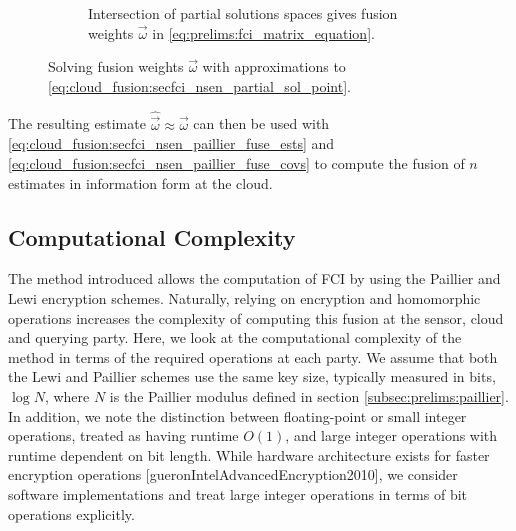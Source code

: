 \begin{figure}[htbp]
\begin{subfigure}[htbp]{\textwidth}
\begin{center}
        \end{center}
        \caption{Intersection of partial solutions spaces gives fusion weights $\vec{\omega}$ in \eqref{eq:prelims:fci_matrix_equation}.}
        \label{fig:3sen_planes}
    \end{subfigure}
    \caption{Solving fusion weights $\vec{\omega}$ with approximations to \eqref{eq:cloud_fusion:secfci_nsen_partial_sol_point}.}
    \label{fig:cloud_fusion:secfci_nsen_partial_sols_and_intersect}
\end{figure}

The resulting estimate $\hat{\vec{\omega}} \approx \vec{\omega}$ can then be used with \eqref{eq:cloud_fusion:secfci_nsen_paillier_fuse_ests} and \eqref{eq:cloud_fusion:secfci_nsen_paillier_fuse_covs} to compute the fusion of $n$ estimates in information form at the cloud.

% 
% 

\subsection{Computational Complexity}\label{subsec:cloud_fusion:secfci_comp_complexity}
The method introduced allows the computation of FCI by using the Paillier and Lewi encryption schemes. Naturally, relying on encryption and homomorphic operations increases the complexity of computing this fusion at the sensor, cloud and querying party. Here, we look at the computational complexity of the method in terms of the required operations at each party. We assume that both the Lewi and Paillier schemes use the same key size, typically measured in bits, $\log{N}$, where $N$ is the Paillier modulus defined in section \ref{subsec:prelims:paillier}. In addition, we note the distinction between floating-point or small integer operations, treated as having runtime $O(1)$, and large integer operations with runtime dependent on bit length. While hardware architecture exists for faster encryption operations [gueronIntelAdvancedEncryption2010], we consider software implementations and treat large integer operations in terms of bit operations explicitly.


